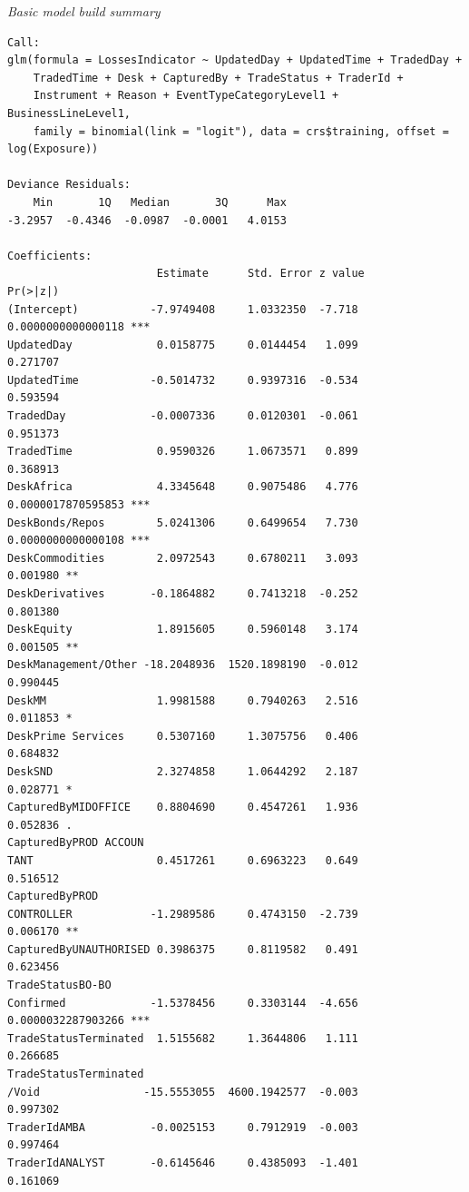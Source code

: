 \documentclass[
]{article}
\begin{document}
\normalsize

\emph{Basic model build summary}

\begin{verbatim}
Call:
glm(formula = LossesIndicator ~ UpdatedDay + UpdatedTime + TradedDay + 
    TradedTime + Desk + CapturedBy + TradeStatus + TraderId + 
    Instrument + Reason + EventTypeCategoryLevel1 + BusinessLineLevel1, 
    family = binomial(link = "logit"), data = crs$training, offset = log(Exposure))

Deviance Residuals: 
    Min       1Q   Median       3Q      Max  
-3.2957  -0.4346  -0.0987  -0.0001   4.0153  

Coefficients:
                       Estimate      Std. Error z value           Pr(>|z|)    
(Intercept)           -7.9749408     1.0332350  -7.718 0.0000000000000118 ***
UpdatedDay             0.0158775     0.0144454   1.099           0.271707    
UpdatedTime           -0.5014732     0.9397316  -0.534           0.593594    
TradedDay             -0.0007336     0.0120301  -0.061           0.951373    
TradedTime             0.9590326     1.0673571   0.899           0.368913    
DeskAfrica             4.3345648     0.9075486   4.776 0.0000017870595853 ***
DeskBonds/Repos        5.0241306     0.6499654   7.730 0.0000000000000108 ***
DeskCommodities        2.0972543     0.6780211   3.093           0.001980 ** 
DeskDerivatives       -0.1864882     0.7413218  -0.252           0.801380    
DeskEquity             1.8915605     0.5960148   3.174           0.001505 ** 
DeskManagement/Other -18.2048936  1520.1898190  -0.012           0.990445    
DeskMM                 1.9981588     0.7940263   2.516           0.011853 *  
DeskPrime Services     0.5307160     1.3075756   0.406           0.684832    
DeskSND                2.3274858     1.0644292   2.187           0.028771 *  
CapturedByMIDOFFICE    0.8804690     0.4547261   1.936           0.052836 .  
CapturedByPROD ACCOUN
TANT                   0.4517261     0.6963223   0.649           0.516512    
CapturedByPROD 
CONTROLLER            -1.2989586     0.4743150  -2.739           0.006170 ** 
CapturedByUNAUTHORISED 0.3986375     0.8119582   0.491           0.623456    
TradeStatusBO-BO 
Confirmed             -1.5378456     0.3303144  -4.656 0.0000032287903266 ***
TradeStatusTerminated  1.5155682     1.3644806   1.111           0.266685    
TradeStatusTerminated
/Void                -15.5553055  4600.1942577  -0.003           0.997302    
TraderIdAMBA          -0.0025153     0.7912919  -0.003           0.997464    
TraderIdANALYST       -0.6145646     0.4385093  -1.401           0.161069    

\end{verbatim}
\end{document}
